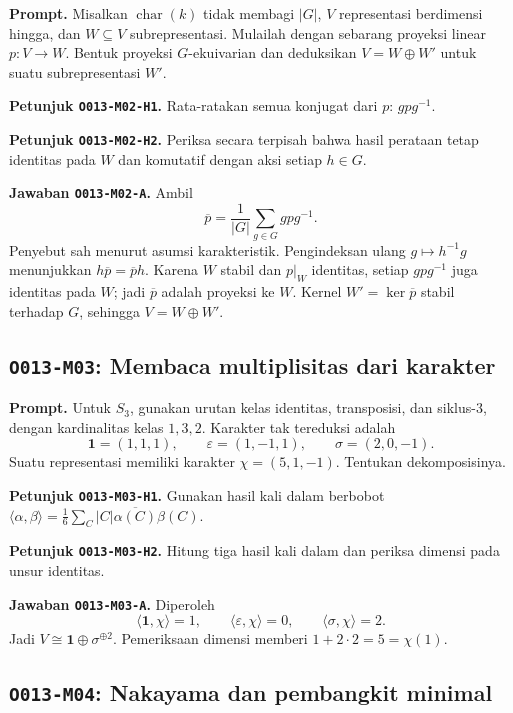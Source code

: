 \documentclass[11pt,a4paper]{article}
\newcommand{\oid}[1]{\texttt{#1}}
\begin{document}
\textbf{Prompt.} Misalkan $\operatorname{char}(k)$ tidak membagi $|G|$,
$V$ representasi berdimensi hingga, dan $W\subseteq V$ subrepresentasi.
Mulailah dengan sebarang proyeksi linear $p:V\to W$. Bentuk proyeksi
$G$-ekuivarian dan deduksikan $V=W\oplus W'$ untuk suatu subrepresentasi $W'$.

\textbf{Petunjuk \oid{O013-M02-H1}.} Rata-ratakan semua konjugat dari $p$:
$gpg^{-1}$.

\textbf{Petunjuk \oid{O013-M02-H2}.} Periksa secara terpisah bahwa hasil
perataan tetap identitas pada $W$ dan komutatif dengan aksi setiap $h\in G$.

\textbf{Jawaban \oid{O013-M02-A}.} Ambil
\[
\overline p=\frac1{|G|}\sum_{g\in G}gpg^{-1}.
\]
Penyebut sah menurut asumsi karakteristik. Pengindeksan ulang $g\mapsto h^{-1}g$
menunjukkan $h\overline p=\overline ph$. Karena $W$ stabil dan $p|_W$ identitas,
setiap $gpg^{-1}$ juga identitas pada $W$; jadi $\overline p$ adalah proyeksi
ke $W$. Kernel $W'=\ker\overline p$ stabil terhadap $G$, sehingga
$V=W\oplus W'$.

\subsection*{\oid{O013-M03}: Membaca multiplisitas dari karakter}

\textbf{Prompt.} Untuk $S_3$, gunakan urutan kelas identitas, transposisi, dan
siklus-$3$, dengan kardinalitas kelas $1,3,2$. Karakter tak tereduksi adalah
\[
\mathbf{1}=(1,1,1),\qquad \varepsilon=(1,-1,1),\qquad \sigma=(2,0,-1).
\]
Suatu representasi memiliki karakter $\chi=(5,1,-1)$. Tentukan dekomposisinya.

\textbf{Petunjuk \oid{O013-M03-H1}.} Gunakan hasil kali dalam berbobot
$\langle\alpha,\beta\rangle=\frac16\sum_C|C|\overline{\alpha(C)}\beta(C)$.

\textbf{Petunjuk \oid{O013-M03-H2}.} Hitung tiga hasil kali dalam dan periksa
dimensi pada unsur identitas.

\textbf{Jawaban \oid{O013-M03-A}.} Diperoleh
\[
\langle\mathbf1,\chi\rangle=1,\qquad
\langle\varepsilon,\chi\rangle=0,\qquad
\langle\sigma,\chi\rangle=2.
\]
Jadi $V\cong\mathbf1\oplus\sigma^{\oplus2}$. Pemeriksaan dimensi memberi
$1+2\cdot2=5=\chi(1)$.

\subsection*{\oid{O013-M04}: Nakayama dan pembangkit minimal}
\end{document}

